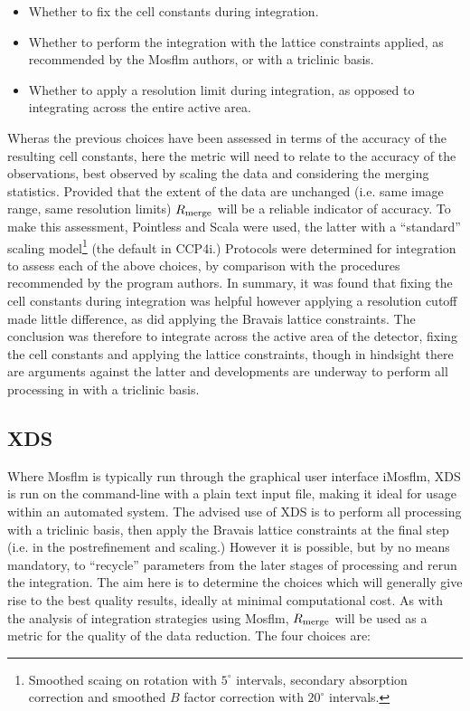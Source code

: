 \documentclass[preprint,pdf]{iucr}
\begin{document}
\begin{itemize}
\item{Whether to fix the cell constants during integration.}
\item{Whether to perform the integration with the lattice constraints
    applied, as recommended by the Mosflm authors, or with a triclinic
    basis.}
\item{Whether to apply a resolution limit during integration,
    as opposed to integrating across the entire active area.}
\end{itemize}

Wheras the previous choices have been assessed in terms of the accuracy
of the resulting cell constants, here the metric will need to relate
to the accuracy of the observations, best observed by scaling the data
and considering the merging statistics. Provided that the extent of
the data are unchanged (i.e. same image range, same resolution limits)
$R_{\rm{merge}}$ will be a reliable indicator of accuracy. To make
this assessment, Pointless \cite{Evans:ba5084} and Scala were
used, the latter with a ``standard'' scaling model\footnote{Smoothed
  scaing on rotation with $5^{\circ}$ intervals, secondary absorption
  correction and smoothed $B$ factor correction with $20^{\circ}$
  intervals.}
(the default in CCP4i.) Protocols were determined for integration to assess each
of the above choices, by comparison with the procedures recommended
by the program authors. In summary, it was found that fixing the cell
constants during integration was helpful however applying a resolution
cutoff made little difference, as did applying the Bravais lattice
constraints. The conclusion was therefore to integrate across the
active area of the detector, fixing the cell constants and applying
the lattice constraints, though in hindsight there are arguments
against the latter and developments are underway to perform all
processing in with a triclinic basis.

\subsection{XDS}

Where Mosflm is typically run through the graphical user interface
iMosflm, XDS is run on the command-line with a plain text input file,
making it ideal for usage 
within an automated system. The advised use of XDS is to perform all
processing with a triclinic basis, then apply the Bravais lattice
constraints at the final step (i.e. in the postrefinement and scaling.) However it
is possible, but by no means mandatory, to ``recycle'' parameters from
the later stages of processing and rerun the integration. The aim here
is to determine the choices which will generally give rise to the best
quality results, ideally at minimal computational cost. As with the
analysis of integration strategies using Mosflm, $R_{\rm{merge}}$ will
be used as a metric for the quality of the data reduction. The four
choices are:
\end{document}
